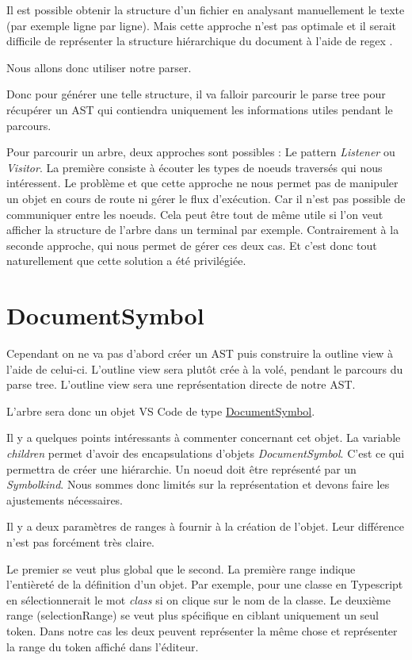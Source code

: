 \documentclass[
    iict, %
    il, %
]{heig-tb}
\begin{document}
Il est possible obtenir la structure d'un fichier en analysant manuellement le texte (par exemple ligne par ligne).
Mais cette approche n'est pas optimale et il serait difficile de représenter la structure hiérarchique du document à l'aide de regex \cite{antlr-mega-tutorial}.

Nous allons donc utiliser notre parser.

Donc pour générer une telle structure, il va falloir parcourir le parse tree pour récupérer un AST qui contiendra uniquement les informations utiles pendant le parcours.

Pour parcourir un arbre, deux approches sont possibles : Le pattern \emph{Listener} ou \emph{Visitor}.
La première consiste à écouter les types de noeuds traversés qui nous intéressent. Le problème et que cette approche ne nous permet pas de manipuler un objet en cours de route ni gérer le flux d'exécution.
Car il n'est pas possible de communiquer entre les noeuds. Cela peut être tout de même utile si l'on veut afficher la structure de l'arbre dans un terminal par exemple.
Contrairement à la seconde approche, qui nous permet de gérer ces deux cas. Et c'est donc tout naturellement que cette solution a été privilégiée.

\section{DocumentSymbol}

Cependant on ne va pas d'abord créer un AST puis construire la outline view à l'aide de celui-ci.
L'outline view sera plutôt crée à la volé, pendant le parcours du parse tree. L'outline view sera une représentation directe de notre AST.

L'arbre sera donc un objet VS Code de type \href{https://code.visualstudio.com/api/references/vscode-api#DocumentSymbol}{DocumentSymbol}.

Il y a quelques points intéressants à commenter concernant cet objet.
La variable \emph{children} permet d'avoir des encapsulations d'objets \emph{DocumentSymbol}. C'est ce qui permettra de créer une hiérarchie.
Un noeud doit être représenté par un \emph{Symbolkind}. Nous sommes donc limités sur la représentation et devons faire les ajustements nécessaires.

Il y a deux paramètres de ranges à fournir à la création de l'objet. Leur différence n'est pas forcément très claire.

Le premier se veut plus global que le second.
La première range indique l'entièreté de la définition d'un objet. Par exemple, pour une classe en Typescript en sélectionnerait le mot \emph{class} si on clique sur le nom de la classe.
Le deuxième range (selectionRange) se veut plus spécifique en ciblant uniquement un seul token.
Dans notre cas les deux peuvent représenter la même chose et représenter la range du token affiché dans l'éditeur.
\end{document}
